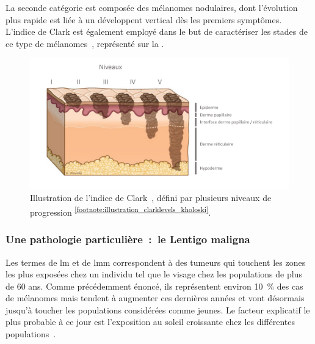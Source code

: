 La seconde catégorie est composée des mélanomes nodulaires, dont l'évolution plus rapide est liée à un développent vertical dès les premiers symptômes. L'indice de Clark est également employé dans le but de caractériser les stades de ce type de mélanomes~\cite{Clark1969}, représenté sur la .\par

\begin{figure}[H]
    \centering
    \includegraphics[width=0.9\linewidth]{contents/chapter_1/resources/illustration_clarklevels_kholoski.pdf}
    \caption{Illustration de l'indice de Clark~\cite{Clark1969}, défini par plusieurs niveaux de progression \textsuperscript{\ref{footnote:illustration_clarklevels_kholoski}}.}
    \label{fig:illustration_clarklevels_kholoski}
\end{figure}\par

\addtocounter{footnote}{1}

\subsubsection{Une pathologie particulière~:~le Lentigo maligna}
\label{subsec:lentigo}
Les termes de \acrfull{lm} et de \acrfull{lmm} correspondent à des tumeurs qui touchent les zones les plus exposées chez un individu tel que le visage chez les populations de plus de 60 ans. Comme précédemment énoncé, ils représentent environ 10~\% des cas de mélanomes mais tendent à augmenter ces dernières années et vont désormais jusqu'à toucher les populations considérées comme jeunes. Le facteur explicatif le plus probable à ce jour est l'exposition au soleil croissante chez les différentes populations~\cite{Baccard2009, LeGal2011, LeDuff2014}.\par

